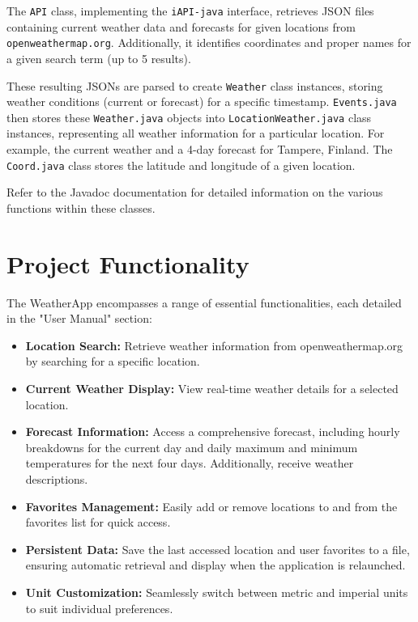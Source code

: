 \documentclass[a4paper,12pt]{article}
\begin{document}
The \texttt{API} class, implementing the \texttt{iAPI-java} interface, retrieves JSON files containing current weather data and forecasts for given locations from \texttt{openweathermap.org}. Additionally, it identifies coordinates and proper names for a given search term (up to 5 results).

These resulting JSONs are parsed to create \texttt{Weather} class instances, storing weather conditions (current or forecast) for a specific timestamp. \texttt{Events.java} then stores these \texttt{Weather.java} objects into \texttt{LocationWeather.java} class instances, representing all weather information for a particular location. For example, the current weather and a 4-day forecast for Tampere, Finland. The \texttt{Coord.java} class stores the latitude and longitude of a given location.

Refer to the Javadoc documentation for detailed information on the various functions within these classes.


\section{Project Functionality}

The WeatherApp encompasses a range of essential functionalities, each detailed in the "User Manual" section:

\begin{itemize}
	\item \textbf{Location Search:} Retrieve weather information from openweathermap.org by searching for a specific location.
	\item \textbf{Current Weather Display:} View real-time weather details for a selected location.
	\item \textbf{Forecast Information:} Access a comprehensive forecast, including hourly breakdowns for the current day and daily maximum and minimum temperatures for the next four days. Additionally, receive weather descriptions.
	\item \textbf{Favorites Management:} Easily add or remove locations to and from the favorites list for quick access.
	\item \textbf{Persistent Data:} Save the last accessed location and user favorites to a file, ensuring automatic retrieval and display when the application is relaunched.
	\item \textbf{Unit Customization:} Seamlessly switch between metric and imperial units to suit individual preferences.
\end{itemize}
\end{document}
